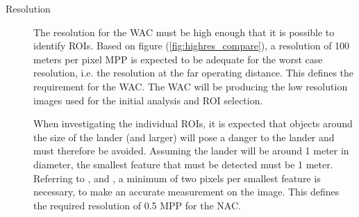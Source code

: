\begin{description}
\item[Resolution]
The resolution for the WAC must be high enough that it is possible to identify ROIs. Based on figure (\ref{fig:highres_compare}), a resolution of 100 meters per pixel MPP is expected to be adequate for the worst case resolution, i.e. the resolution at the far operating distance. This defines the requirement for the WAC. The WAC will be producing the low resolution images used for the initial analysis and ROI selection.

When investigating the individual ROIs, it is expected that objects around the size of the lander (and larger) will pose a danger to the lander and must therefore be avoided. Assuming the lander will be around 1 meter in diameter, the smallest feature that must be detected must be 1 meter. Referring to \cite{andor2016}, \cite{ni2014} and \cite{sbig2014}, a minimum of two pixels per smallest feature is necessary, to make an accurate measurement on the image. This defines the required resolution of 0.5 MPP for the NAC.


\end{description}
